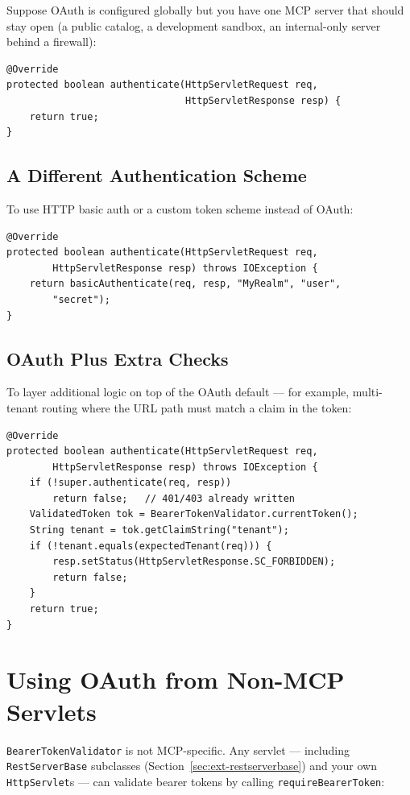 Suppose OAuth is configured globally but you have one MCP server that should stay open (a public catalog, a development sandbox, an internal-only server behind a firewall):

\begin{lstlisting}[style=java]
@Override
protected boolean authenticate(HttpServletRequest req,
                               HttpServletResponse resp) {
    return true;
}
\end{lstlisting}

\subsection{A Different Authentication Scheme}

To use HTTP basic auth or a custom token scheme instead of OAuth:

\begin{lstlisting}[style=java]
@Override
protected boolean authenticate(HttpServletRequest req,
        HttpServletResponse resp) throws IOException {
    return basicAuthenticate(req, resp, "MyRealm", "user",
        "secret");
}
\end{lstlisting}

\subsection{OAuth Plus Extra Checks}

To layer additional logic on top of the OAuth default --- for example, multi-tenant routing where the URL path must match a claim in the token:

\begin{lstlisting}[style=java]
@Override
protected boolean authenticate(HttpServletRequest req,
        HttpServletResponse resp) throws IOException {
    if (!super.authenticate(req, resp))
        return false;   // 401/403 already written
    ValidatedToken tok = BearerTokenValidator.currentToken();
    String tenant = tok.getClaimString("tenant");
    if (!tenant.equals(expectedTenant(req))) {
        resp.setStatus(HttpServletResponse.SC_FORBIDDEN);
        return false;
    }
    return true;
}
\end{lstlisting}

\section{Using OAuth from Non-MCP Servlets}
\label{sec:oauth-non-mcp}

\texttt{Bearer\-Token\-Validator} is not MCP-specific.  Any servlet --- including \texttt{RestServer\-Base} subclasses (Section~\ref{sec:ext-restserverbase}) and your own \texttt{HttpServlet}s --- can validate bearer tokens by calling \texttt{requireBearerToken}:


